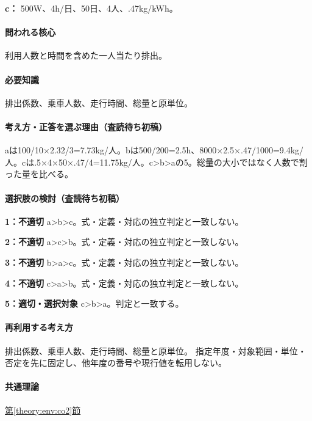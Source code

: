 \noindent\textbf{c：} 500W、4h/日、50日、4人、.47kg/kWh。\par

\paragraph{問われる核心} 利用人数と時間を含めた一人当たり排出。

\paragraph{必要知識} 排出係数、乗車人数、走行時間、総量と原単位。

\paragraph{考え方・正答を選ぶ理由（査読待ち初稿）} aは100/10×2.32/3=\allowbreak{}7.73kg/人。bは500/200=\allowbreak{}2.5h、8000×2.5×.47/1000=\allowbreak{}9.4kg/人。cは.5×4×50×.47/4=\allowbreak{}11.75kg/人。c>b>aの5。総量の大小ではなく人数で割った量を比べる。

\paragraph{選択肢の検討（査読待ち初稿）}\mbox{}\par

\noindent\textbf{1：不適切} a>b>c。式・定義・対応の独立判定と一致しない。\par

\noindent\textbf{2：不適切} a>c>b。式・定義・対応の独立判定と一致しない。\par

\noindent\textbf{3：不適切} b>a>c。式・定義・対応の独立判定と一致しない。\par

\noindent\textbf{4：不適切} c>a>b。式・定義・対応の独立判定と一致しない。\par

\noindent\textbf{5：適切・選択対象} c>b>a。判定と一致する。\par

\paragraph{再利用する考え方} 排出係数、乗車人数、走行時間、総量と原単位。 指定年度・対象範囲・単位・否定を先に固定し、他年度の番号や現行値を転用しない。

\paragraph{共通理論} \hyperref[theory:env:co2]{第\ref*{theory:env:co2}節}

